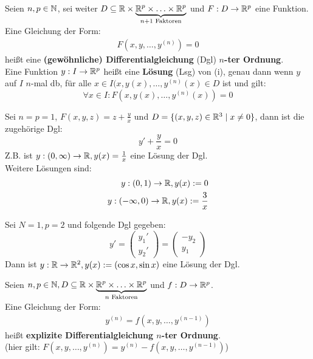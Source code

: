 \documentclass[a4paper,twoside,DIV15,BCOR12mm,chapterprefix=true,headings=twolinechapter]{scrbook}
\begin{document}
\begin{definition}
Seien $n,p\in\mathbb{N}$, sei weiter 
$D\subseteq\mathbb{R}\times\underbrace{\mathbb{R}^p\times\ldots\times\mathbb{R}^p}_{n+1 \text{ Faktoren}}$
und $F:D\to\mathbb{R}^p$ eine Funktion.\\
Eine Gleichung der Form:
\begin{align*}
F(x,y,\ldots,y^{(n)})=0 \tag{i}
\end{align*}
heißt eine \textbf{(gewöhnliche) Differentialgleichung} (Dgl) \textbf{$n$-ter Ordnung}.\\
Eine Funktion $y:I\to\mathbb{R}^p$ heißt eine \textbf{Lösung} (Lsg) von (i), genau dann wenn
$y$ auf $I$ $n$-mal db, für alle $x\in I (x,y(x),\ldots,y^{(n)}(x)\in D$ ist und gilt:
\[\forall x\in I: F(x,y(x),\ldots,y^{(n)}(x))=0\] 
\end{definition}

\begin{beispiele}
\item Sei $n=p=1$, $F(x,y,z)=z+\frac yx$ und $D=\{(x,y,z)\in\mathbb{R}^3\mid x\ne 0\}$, dann ist die
zugehörige Dgl:
\[y'+\frac yx =0\]
Z.B. ist $y:(0,\infty)\to\mathbb{R}, y(x)=\frac1x$ eine Lösung der Dgl.\\
Weitere Lösungen sind:
\begin{align*}
y:(0,1)\to\mathbb{R},y(x):=0\\
y:(-\infty,0)\to\mathbb{R},y(x):=\frac3x
\end{align*}
\item Sei $N=1,p=2$ und folgende Dgl gegeben:
\[y'=\begin{pmatrix}y_1'\\y_2'\end{pmatrix}=\begin{pmatrix}-y_2\\y_1\end{pmatrix}\]
Dann ist $y:\mathbb{R}\to\mathbb{R}^2, y(x):=(\cos x,\sin x)$ eine Lösung der Dgl.
\end{beispiele}

\begin{definition}
Seien $n,p\in\mathbb{N}, D\subseteq \mathbb{R}\times\underbrace{\mathbb{R}^p\times\ldots\times\mathbb{R}^p}_{n \text{ Faktoren}}$
und $f:D\to\mathbb{R}^p$.\\
Eine Gleichung der Form:
\begin{align*}
y^{(n)}=f(x,y,\ldots,y^{(n-1)})\tag{ii}
\end{align*}
heißt \textbf{explizite Differentialgleichung $n$-ter Ordnung}.\\
(hier gilt: $F(x,y,\ldots,y^{(n)})=y^{(n)}-f(x,y,\ldots,y^{(n-1)})$)
\end{definition}
\end{document}
